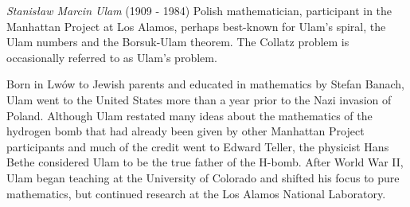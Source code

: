 \documentclass[12pt]{article}
\begin{document}
\emph{Stanis\l{}aw Marcin Ulam} (1909 - 1984) Polish mathematician, participant in the Manhattan Project at Los Alamos, perhaps best-known for Ulam's spiral, the Ulam numbers and the Borsuk-Ulam theorem. The Collatz problem is occasionally referred to as Ulam's problem.

Born in Lw\'ow to Jewish parents and educated in mathematics by Stefan Banach, Ulam went to the United States more than a year prior to the Nazi invasion of Poland. Although Ulam restated many ideas about the mathematics of the hydrogen bomb that had already been given by other Manhattan Project participants and much of the credit went to Edward Teller, the physicist Hans Bethe considered Ulam to be the true father of the H-bomb. After World War II, Ulam began teaching at the University of Colorado and shifted his focus to pure mathematics, but continued research at the Los Alamos National Laboratory.
\end{document}
